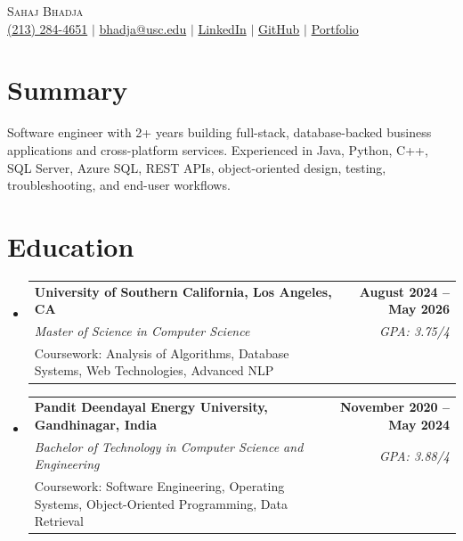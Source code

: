 \documentclass[letterpaper,10pt]{article}
\makeatletter
\newcommand{\resumeEduSubheading}[5]{\vspace{-1pt}\item\begin{tabular*}{1.0\textwidth}[t]{l@{\extracolsep{\fill}}r}\textbf{#1} & \textbf{\small #2} \\\textit{\small #3} & \textit{\small #4} \\\small #5 & \\\end{tabular*}\vspace{-4pt}}
\newcommand{\resumeSubHeadingListStart}{\begin{itemize}[leftmargin=0.0in,label={}]}
\newcommand{\resumeSubHeadingListEnd}{\end{itemize}}
\makeatother
\begin{document}
\begin{center}
  {\Huge \scshape Sahaj Bhadja} \\ \vspace{1pt}
  \small \href{tel:2132844651}{(213) 284-4651} $|$ \href{mailto:bhadja@usc.edu}{bhadja@usc.edu} $|$
  \href{https://www.linkedin.com/in/sahaj-bhadja/}{LinkedIn} $|$ \href{https://github.com/sahaj-bhadja}{GitHub} $|$ \href{https://sahaj-bhadja.github.io/}{Portfolio}
\end{center}
\vspace{-13pt}

\section{Summary}
\small Software engineer with 2+ years building full-stack, database-backed business applications and cross-platform services. Experienced in Java, Python, C++, SQL Server, Azure SQL, REST APIs, object-oriented design, testing, troubleshooting, and end-user workflows.

\section{Education}
\resumeSubHeadingListStart
  \resumeEduSubheading{University of Southern California, Los Angeles, CA}{August 2024 -- May 2026}{Master of Science in Computer Science}{GPA: 3.75/4}{Coursework: Analysis of Algorithms, Database Systems, Web Technologies, Advanced NLP}
  \vspace{2pt}
  \resumeEduSubheading{Pandit Deendayal Energy University, Gandhinagar, India}{November 2020 -- May 2024}{Bachelor of Technology in Computer Science and Engineering}{GPA: 3.88/4}{Coursework: Software Engineering, Operating Systems, Object-Oriented Programming, Data Retrieval}
\resumeSubHeadingListEnd
\end{document}
